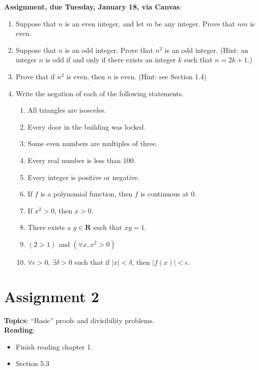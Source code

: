 \documentclass[12pt]{article}
\begin{document}
\noindent \textbf{Assignment, due Tuesday, January 18, via Canvas}:
\begin{enumerate}
\item Suppose that $n$ is an even integer, and let $m$ be any integer. Prove that $nm$ is even. 
\item Suppose that $n$ is an odd integer. Prove that $n^2$ is an odd integer. (Hint: an integer $n$ is odd if and only if there exists an integer $k$ such that $n = 2k+1$.)
\item Prove that if $n^2$ is even, then $n$ is even. (Hint: see Section 1.4)
\item Write the negation of each of the following statements.

 \begin{enumerate}
\item All triangles are isosceles.
\item Every door in the building was locked.
\item Some even numbers are multiples of three.
\item Every real number is less than 100.
\item Every integer is positive or negative.
\item If $f$ is a polynomial function, then $f$ is continuous at $0$.
\item If $x^2 > 0$, then $x > 0$.
\item There exists a $y \in \mathbf{R}$ such that $xy = 1$.
\item $(2 > 1)$ and $(\forall x, x^2 > 0)$
\item $\forall \epsilon > 0$, $\exists \delta > 0$ such that if $|x| < \delta$, then $|f(x)| < \epsilon$.
\end{enumerate}
\end{enumerate}

\newpage
\section[2 (due January 25): Divisibility problems.]{Assignment 2}

\textbf{Topics}: ``Basic'' proofs and divisibility problems. 
\\



\noindent \textbf{Reading}:
\begin{itemize}
\item Finish reading chapter 1.
\item Section 5.3
\end{itemize}
\end{document}
